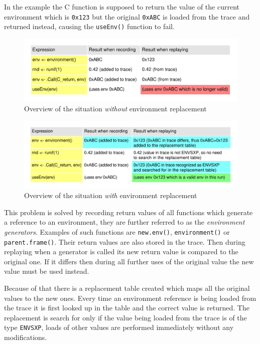 \documentclass[thesis=M,english,hidelinks]{FITthesis}[2012/10/20]
\begin{document}
		In the example the C function is supposed to return the value of the current environment which is \lstinline|0x123| but the original \lstinline|0xABC| is loaded from the trace and returned instead, causing the \lstinline|useEnv()| function to fail.\par
		
		\begin{figure}[ht]\centering
			\includegraphics[width=1.0\textwidth]{img/env_replace}
			\caption{Overview of the situation \emph{without} environment replacement}\label{fig:env_replace}
		\end{figure}
		
		\begin{figure}[ht]\centering
			\includegraphics[width=1.0\textwidth]{img/env_replace2}
			\caption{Overview of the situation \emph{with} environment replacement}\label{fig:env_replace2}
		\end{figure}
		
		This problem is solved by recording return values of all functions which generate a reference to an environment, they are further referred to as the \emph{environment generators}. Examples of such functions are \lstinline|new.env()|, \lstinline|environment()| or \lstinline|parent.frame()|. Their return values are also stored in the trace. Then during replaying when a generator is called its new return value is compared to the original one. If it differs then during all further uses of the original value the new value must be used instead.\par
		
		Because of that there is a replacement table created which maps all the original values to the new ones. Every time an environment reference is being loaded from the trace it is first looked up in the table and the correct value is returned. The replacement is search for only if the value being loaded from the trace is of the type \lstinline|ENVSXP|, loads of other values are performed immediately without any modifications.\par
		
\end{document}

